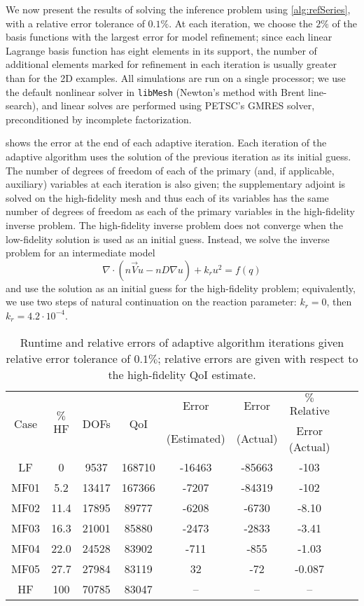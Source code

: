 We now present the results of solving the inference problem using \cref{alg:refSeries}, with a relative error tolerance of $0.1\%$. At each iteration, we choose the $2\%$ of the basis functions with the largest error for model refinement; since each linear Lagrange basis function has eight elements in its support, the number of additional elements marked for refinement in each iteration is usually greater than for the 2D examples. All simulations are run on a single processor; we use the default nonlinear solver in \texttt{libMesh} \cite{libMeshPaper} (Newton's method with Brent line-search), and linear solves are performed using PETSC's GMRES solver, preconditioned by incomplete factorization. %

 shows the error at the end of each adaptive iteration. Each iteration of the adaptive algorithm uses the solution of the previous iteration as its initial guess. The number of degrees of freedom of each of the primary (and, if applicable, auxiliary) variables at each iteration is also given; the supplementary adjoint is solved on the high-fidelity mesh and thus each of its variables has the same number of degrees of freedom as each of the primary variables in the high-fidelity inverse problem. The high-fidelity inverse problem does not converge when the low-fidelity solution is used as an initial guess. Instead, we solve the inverse problem for an intermediate model
%
\begin{equation}
\nabla\cdot(n\vec{V}u - nD\nabla u) + k_ru^2 = f(q)
\end{equation}
%
and use the solution as an initial guess for the high-fidelity problem; equivalently, we use two steps of natural continuation on the reaction parameter: $k_r=0$, then $k_r=4.2\cdot10^{-4}$.
%
\begin{table}[htbp]
\caption{Runtime and relative errors of adaptive algorithm iterations given relative error tolerance of $0.1\%$; relative errors are given with respect to the high-fidelity QoI estimate.}
\label{tab:ref3D_diffmesh}
\centering
\begin{tabular}{|c|c|c|c|c|c|c|c|c|}
\hline
\multirow{2}{*}{Case} & \multirow{2}{*}{$\%$HF} & \multirow{2}{*}{DOFs} & \multirow{2}{*}{QoI} & Error & Error & $\%$ Relative \\
& & & & (Estimated) & (Actual) & Error (Actual)  \\ \hline
LF   & 0    & 9537  & 168710 & -16463 & -85663 & -103    \\
MF01 & 5.2  & 13417 & 167366 & -7207  & -84319 & -102    \\
MF02 & 11.4 & 17895 & 89777  & -6208  & -6730  & -8.10   \\
MF03 & 16.3 & 21001 & 85880  & -2473  & -2833  & -3.41   \\
MF04 & 22.0 & 24528 & 83902  & -711   & -855   & -1.03   \\
MF05 & 27.7 & 27984 & 83119  & 32     & -72    & -0.087  \\
HF   & 100  & 70785 & 83047  & --     & --     & --    \\ \hline
\end{tabular}
\end{table}
%

